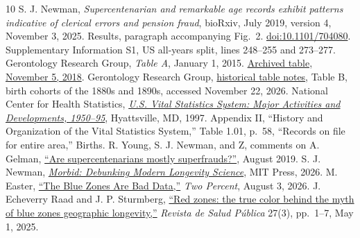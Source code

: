 \documentclass[11pt]{article}
\begin{document}
\begin{thebibliography}{10}
 S. J. Newman, \emph{Supercentenarian and remarkable age records exhibit patterns indicative of clerical errors and pension fraud}, bioRxiv, July 2019, version 4, November 3, 2025. Results, paragraph accompanying Fig.~2. \href{https://doi.org/10.1101/704080}{doi:10.1101/704080}. Supplementary Information S1, US all-years split, lines 248--255 and 273--277.
 Gerontology Research Group, \emph{Table A}, January 1, 2015. \href{https://web.archive.org/web/20181105195239id_/http://www.grg.org/Adams/A_files/sheet001.htm}{Archived table, November 5, 2018}.
 Gerontology Research Group, \href{https://grg.org/SC/SCListsTables.html}{historical table notes}, Table B, birth cohorts of the 1880s and 1890s, accessed November 22, 2026.
 National Center for Health Statistics, \href{https://ftp.cdc.gov/pub/health_Statistics/nchs/publications/DVD/DVD_3/Misc/usvss.pdf}{\emph{U.S. Vital Statistics System: Major Activities and Developments, 1950--95}}, Hyattsville, MD, 1997. Appendix II, “History and Organization of the Vital Statistics System,” Table 1.01, p.~58, “Records on file for entire area,” Births.
 R. Young, S. J. Newman, and Z, comments on A. Gelman, \href{https://statmodeling.stat.columbia.edu/2019/08/06/are-supercentenarians-mostly-superfrauds/}{“Are supercentenarians mostly superfrauds?”}, August 2019.
 S. J. Newman, \href{https://doi.org/10.7551/mitpress/16097.001.0001}{\emph{Morbid: Debunking Modern Longevity Science}}, MIT Press, 2026.
 M. Easter, \href{https://www.twopct.com/p/the-blue-zones-arent-real}{“The Blue Zones Are Bad Data,”} \emph{Two Percent}, August 3, 2026.
 J. Echeverry Raad and J. P. Sturmberg, \href{https://doi.org/10.15446/rsap.v27n3.119673}{“Red zones: the true color behind the myth of blue zones geographic longevity,”} \emph{Revista de Salud Pública} 27(3), pp.~1--7, May 1, 2025.
\end{thebibliography}
\end{document}
